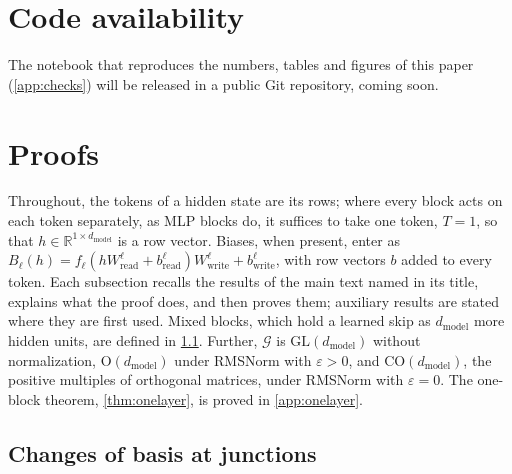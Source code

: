 \documentclass[10pt]{article}
\theoremstyle{definition}
\theoremstyle{remark}
\newcommand{\R}{\mathbb{R}}
\newcommand{\Wread}{W_{\mathrm{read}}}
\newcommand{\Wwrite}{W_{\mathrm{write}}}
\newcommand{\dm}{d_{\mathrm{model}}}
\newcommand{\GL}{\mathrm{GL}}
\newcommand{\Ort}{\mathrm{O}}
\newcommand{\CO}{\mathrm{CO}}
\newcommand{\G}{\mathcal{G}}
\begin{document}
\section*{Code availability}
The notebook that reproduces the numbers, tables and figures of this paper (\cref{app:checks}) will be released in a public Git repository, coming soon.




\appendix
\section{Proofs}\label{app:proofs}

Throughout, the tokens of a hidden state are its rows; where every block acts on each token separately, as MLP blocks do, it suffices to take one token, $T = 1$, so that $h \in \R^{1\times\dm}$ is a row vector. Biases, when present, enter as $B_\ell(h) = f_\ell(h\Wread^{\ell} + b^{\ell}_{\mathrm{read}})\Wwrite^{\ell} + b^{\ell}_{\mathrm{write}}$, with row vectors $b$ added to every token. Each subsection recalls the results of the main text named in its title, explains what the proof does, and then proves them; auxiliary results are stated where they are first used. Mixed blocks, which hold a learned skip as $\dm$ more hidden units, are defined in \cref{app:prf-junction}. Further, $\G$ is $\GL(\dm)$ without normalization, $\Ort(\dm)$ under RMSNorm with $\varepsilon > 0$, and $\CO(\dm)$, the positive multiples of orthogonal matrices, under RMSNorm with $\varepsilon = 0$. The one-block theorem, \cref{thm:onelayer}, is proved in \cref{app:onelayer}.

\subsection{Changes of basis at junctions}\label{app:prf-junction}
\end{document}
